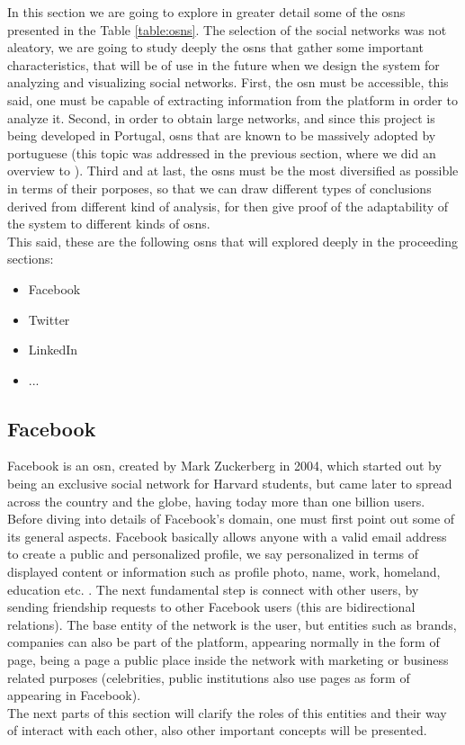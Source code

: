 In this section we are going to explore in greater detail some of the \glspl{osn} presented
in the Table \ref{table:osns}. The selection of the social networks was not aleatory, we are going
to study deeply the \glspl{osn} that gather some important characteristics, that will be of use in
the future when we design the system for analyzing and visualizing social networks. First, the
\gls{osn} must be accessible, this said, one must be capable of extracting information from the platform
in order to analyze it. Second, in order to obtain large networks, and since this project is being
developed in Portugal, \glspl{osn} that are known to be massively adopted by portuguese (this topic was
addressed in the previous section, where we did an overview to \cite{marktest2016}). Third and at last,
the \glspl{osn} must be the most diversified as possible in terms of their porposes, so that we
can draw different types of conclusions derived from different kind of analysis, for then give proof
of the adaptability of the system to different kinds of \glspl{osn}.\\
\indent This said, these are the following \glspl{osn} that will explored deeply in the proceeding sections:
\begin{itemize}
  \item Facebook
  \item Twitter
  \item LinkedIn
  \item ...
\end{itemize}

\subsection{Facebook}

Facebook is an \gls{osn}, created by Mark Zuckerberg in 2004, which started out by being an exclusive social network for Harvard students, but came later to spread across
the country and the globe, having today more than one billion users.\\
\indent Before diving into details of Facebook's domain, one must first point out some of its general aspects. Facebook basically allows anyone with a valid email address to create a public and personalized profile,
we say personalized in terms of displayed content or information such as profile photo, name, work, homeland, education etc. .
The next fundamental step is connect with other users, by sending friendship requests to other Facebook users (this are bidirectional relations).
The base entity of the network is the user, but entities such as brands, companies can also be part of the platform, appearing normally
in the form of page, being a page a public place inside the network with marketing or business related purposes (celebrities, public institutions also use pages as form of appearing in Facebook).\\
\indent The next parts of this section will clarify the roles of this entities and their way of interact with each other, also other important concepts will be presented.


